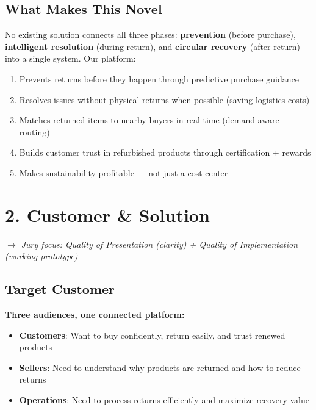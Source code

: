 \documentclass[11pt,a4paper]{article}
\begin{document}
\subsection{What Makes This Novel}
No existing solution connects all three phases: \textbf{prevention} (before purchase), \textbf{intelligent resolution} (during return), and \textbf{circular recovery} (after return) into a single system. Our platform:
\begin{enumerate}[noitemsep]
\item Prevents returns before they happen through predictive purchase guidance
\item Resolves issues without physical returns when possible (saving logistics costs)
\item Matches returned items to nearby buyers in real-time (demand-aware routing)
\item Builds customer trust in refurbished products through certification + rewards
\item Makes sustainability profitable --- not just a cost center
\end{enumerate}

\newpage

\section{2. Customer \& Solution}
{\small\itshape $\rightarrow$ Jury focus: Quality of Presentation (clarity) + Quality of Implementation (working prototype)}

\subsection{Target Customer}
\textbf{Three audiences, one connected platform:}
\begin{itemize}[noitemsep]
\item \textbf{Customers}: Want to buy confidently, return easily, and trust renewed products
\item \textbf{Sellers}: Need to understand why products are returned and how to reduce returns
\item \textbf{Operations}: Need to process returns efficiently and maximize recovery value
\end{itemize}
\end{document}
